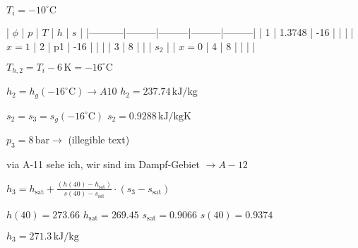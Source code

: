 \( T_i = -10^\circ \text{C} \)  

| \( \phi \) | \( p \) | \( T \) | \( h \) | \( s \) |  
|-----------|---------|---------|---------|---------|  
| 1         | 1.3748  | -16     |         |         |  
| \( x = 1 \) | 2       | p1      | -16     |         |         |  
| 3         | 8       |         |         | \( s_2 \) |  
| \( x = 0 \) | 4       | 8       |         |         |         |  

\( T_{h,2} = T_i - 6 \, \text{K} = -16^\circ \text{C} \)  

\( h_2 = h_g(-16^\circ \text{C}) \rightarrow A10 \)  
\( h_2 = 237.74 \, \text{kJ/kg} \)  

\( s_2 = s_3 = s_g(-16^\circ \text{C}) \)  
\( s_2 = 0.9288 \, \text{kJ/kgK} \)  

\( p_3 = 8 \, \text{bar} \rightarrow \) (illegible text)  

via A-11 sehe ich, wir sind im Dampf-Gebiet  
\( \rightarrow A-12 \)  

\( h_3 = h_{\text{sat}} + \frac{(h(40) - h_{\text{sat}})}{s(40) - s_{\text{sat}}} \cdot (s_3 - s_{\text{sat}}) \)  

\( h(40) = 273.66 \)  
\( h_{\text{sat}} = 269.45 \)  
\( s_{\text{sat}} = 0.9066 \)  
\( s(40) = 0.9374 \)  

\( h_3 = 271.3 \, \text{kJ/kg} \)
